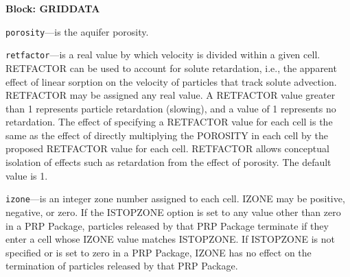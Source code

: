 
\item \textbf{Block: GRIDDATA}

\begin{description}
\item \texttt{porosity}---is the aquifer porosity.

\item \texttt{retfactor}---is a real value by which velocity is divided within a given cell.  RETFACTOR can be used to account for solute retardation, i.e., the apparent effect of linear sorption on the velocity of particles that track solute advection.  RETFACTOR may be assigned any real value.  A RETFACTOR value greater than 1 represents particle retardation (slowing), and a value of 1 represents no retardation.  The effect of specifying a RETFACTOR value for each cell is the same as the effect of directly multiplying the POROSITY in each cell by the proposed RETFACTOR value for each cell.  RETFACTOR allows conceptual isolation of effects such as retardation from the effect of porosity.  The default value is 1.

\item \texttt{izone}---is an integer zone number assigned to each cell.  IZONE may be positive, negative, or zero.  If the ISTOPZONE option is set to any value other than zero in a PRP Package, particles released by that PRP Package terminate if they enter a cell whose IZONE value matches ISTOPZONE.  If ISTOPZONE is not specified or is set to zero in a PRP Package, IZONE has no effect on the termination of particles released by that PRP Package.

\end{description}

